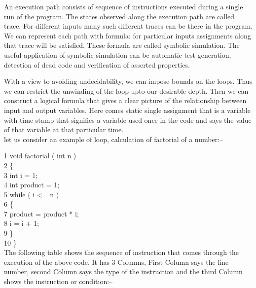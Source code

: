 An execution path consists of sequence of instructions executed during a single 
run of the program. The states observed along the execution path are called 
trace. For different inputs many such different traces can be there in the 
program. We can represent each path with formula: for particular inputs 
assignments along that trace will be satisfied. These formula are called 
symbolic simulation. The useful application of symbolic simulation can be
automatic test generation, detection of dead code and verification of asserted
 properties.

With a view to avoiding undecidability, we can impose bounds on the loops. Thus 
we can restrict the unwinding of the loop upto our desirable depth. Then we can
construct a logical formula that gives a clear picture of the relationship 
between input and output variables. Here comes static single assignment that is
a variable with time stamp that signifies a variable used once in the code
and says the value of that variable at that particular time.\\

let us consider an example of loop, calculation of factorial of a number:--

\noindent

1 void factorial ( int n )\\

2 \{\\

3 int i = 1;\\

4 int product = 1;\\

5 while ( i <= n )\\

6 \{\\

7 product = product * i;\\

8 i = i + 1;\\

9 \}\\

10 \}\\

The following table shows the sequence of instruction that comes through the
execution of the above code. It has 3 Columns, First Column says the line 
number, second Column says the type of the instruction and the third Column
shows the instruction or condition:--

